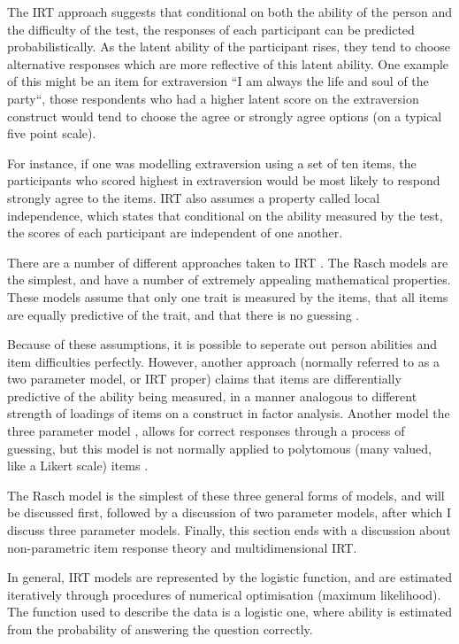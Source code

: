 The IRT approach suggests that conditional on both the ability of the person and the difficulty of the test, the responses of each participant can be predicted probabilistically. As the latent ability of the participant rises, they tend to choose alternative responses which are more reflective of this latent ability. One example of this might be an item for extraversion ``I am always the life and soul of the party``, those respondents who had a higher latent score on the extraversion construct would tend to choose the agree or strongly agree options (on a typical five point scale). 

For instance, if one was modelling extraversion using a set of ten items, the participants who scored highest in extraversion would be most likely to respond strongly agree to the items.  IRT also assumes a property called local independence, which states that conditional on the ability measured by the test, the scores of each participant are independent of one another.

There are a number of different approaches taken to IRT \cite{van1997handbook,fischer1995rasch}. The  Rasch models are the simplest, and have a number of extremely appealing mathematical properties. These models assume that only one trait is measured by the items, that all items are equally predictive of the trait, and that there is no guessing \cite{van1997handbook}.

Because of these assumptions, it is possible to seperate out person abilities and item difficulties perfectly. However, another approach (normally referred to as a two parameter model, or IRT proper) claims that items are differentially predictive of the ability being measured, in a manner analogous to different strength of loadings of items on a construct in factor analysis. Another model the three parameter model \cite{lord1968statistical}, allows for correct responses through a process of guessing, but this model is not normally applied to polytomous (many valued, like a Likert scale) items \cite{van1997handbook,Mair2010}.

The Rasch model is the simplest of these three general forms of models, and will be discussed first, followed by a discussion of two parameter models, after which I discuss three parameter models. Finally, this section ends with a discussion about non-parametric item response theory and multidimensional IRT.

In general, IRT models are represented by the logistic function, and are estimated iteratively through procedures of numerical optimisation (maximum likelihood). The function used to describe the data is a logistic one, where ability is estimated from the probability of answering the question correctly.

